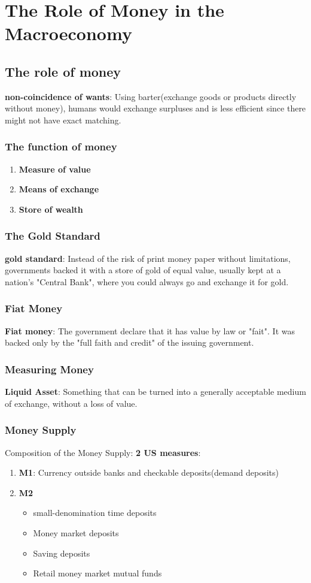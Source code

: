 \documentclass{article}
\theoremstyle{definition}
\theoremstyle{thrm}
\theoremstyle{lma}
\theoremstyle{ppst}
\theoremstyle{crlr}
\begin{document}
\section{The Role of Money in the Macroeconomy}

\subsection{The role of money}
\textbf{non-coincidence of wants}: Using barter(exchange goods or products directly without money), humans would exchange surpluses and is less efficient since there might not have exact matching. 
\subsubsection{The function of money}
\begin{enumerate}
	\item \textbf{Measure of value}
	\item \textbf{Means of exchange}
	\item \textbf{Store of wealth}
\end{enumerate}
\subsubsection{The Gold Standard}
\textbf{gold standard}: Instead of the risk of print money paper without limitations, governments backed it with a store of gold of equal value, usually kept at a nation's "Central Bank", where you could always go and exchange it for gold.
\subsubsection{Fiat Money}
\textbf{Fiat money}: The government declare that it has value by law or "fait". It was backed only by the "full faith and credit" of the issuing government. 
\subsubsection{Measuring Money}
\textbf{Liquid Asset}: Something that can be turned into a generally acceptable medium of exchange, without a loss of value.
\subsubsection{Money Supply}
Composition of the Money Supply: \textbf{2 US measures}:
\begin{enumerate}
	\item \textbf{M1}: Currency outside banks and checkable deposits(demand deposits)
	\item \textbf{M2}
	\begin{itemize}
		\item small-denomination time deposits
		\item Money market deposits
		\item Saving deposits
		\item Retail money market mutual funds
	\end{itemize}
\end{enumerate}
\end{document}
